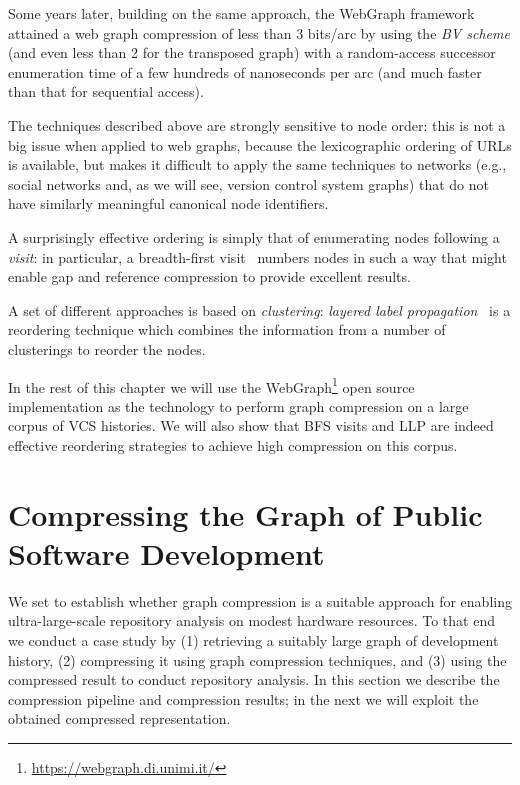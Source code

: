 Some years later, building on the same approach, the WebGraph
framework~\cite{boldi-vigna-webgraph-1} attained a web graph compression of
less than 3 bits/arc by using the \emph{BV scheme} (and even less than 2 for
the transposed graph) with a random-access successor enumeration time of a few
hundreds of nanoseconds per arc (and much faster than that for sequential
access).

The techniques described above are strongly sensitive to node order: this is
not a big issue when applied to web graphs, because the lexicographic ordering
of URLs is available, but makes it difficult to apply the same techniques to
networks (e.g., social networks and, as we will see, version control system
graphs) that do not have similarly meaningful canonical node identifiers.

A surprisingly effective ordering is simply that of enumerating nodes following
a \emph{visit}: in particular, a breadth-first visit~\cite{ApDGCB} numbers
nodes in such a way that might enable gap and reference compression to provide
excellent results.

A set of different approaches is based on \emph{clustering}: \emph{layered
  label propagation}~\cite{BRSLLP} is a reordering technique which combines
the information from a number of clusterings to reorder the nodes.

In the rest of this chapter we will use the
WebGraph\footnote{\url{https://webgraph.di.unimi.it/}} open source
implementation as the technology to perform graph compression on a large corpus
of VCS histories.  We will also show that \gls{BFS} visits and \gls{LLP} are
indeed effective reordering strategies to achieve high compression on this
corpus.

\section{Compressing the Graph of Public Software Development}%
\label{sec:compression-comp}

We set to establish whether graph compression is a suitable approach for
enabling ultra-large-scale repository analysis on modest hardware resources.
To that end we conduct a case study by (1) retrieving a suitably large
graph of development history, (2) compressing it using graph compression
techniques, and (3) using the compressed result to conduct repository analysis.
In this section we describe the compression pipeline and compression results;
in the next we will exploit the obtained compressed representation.

